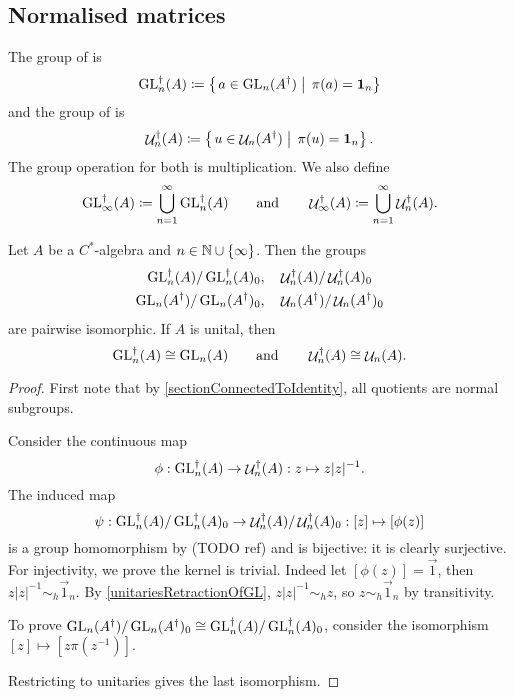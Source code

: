\subsection{Normalised matrices}
\begin{definition}
The group of  is
\[ \operatorname{GL}_n^\dagger(A) \coloneqq \left\{\left. a\in \operatorname{GL}_n(A^\dagger) \;\right|\; \pi(a) = \boldsymbol{\mathrm{1}}_n \right\} \]
and the group of  is
\[ \mathop{\mathcal{U}}\nolimits_n^\dagger(A) \coloneqq \left\{\left. u\in \mathop{\mathcal{U}}\nolimits_n(A^\dagger) \;\right|\; \pi(u) = \boldsymbol{\mathrm{1}}_n \right\}. \]
The group operation for both is multiplication. We also define
\[ \operatorname{GL}_\infty^\dagger(A) \coloneqq \bigcup_{n=1}^\infty\operatorname{GL}_n^\dagger(A) \qquad \text{and}\qquad \mathop{\mathcal{U}}\nolimits_\infty^\dagger(A) \coloneqq \bigcup_{n=1}^\infty\mathop{\mathcal{U}}\nolimits_n^\dagger(A). \]
\end{definition}

\begin{proposition} \label{normalisedQuotientsIsomorphisms}
Let $A$ be a $C^*$-algebra and $n\in \mathbb{N}\cup\{\infty\}$. Then the groups
\begin{align*}
\operatorname{GL}_n^\dagger(A) / \operatorname{GL}_n^\dagger(A)_0,& & &\mathop{\mathcal{U}}\nolimits_n^\dagger(A) / \mathop{\mathcal{U}}\nolimits_n^\dagger(A)_0 \\
\operatorname{GL}_n(A^\dagger) / \operatorname{GL}_n(A^\dagger)_0,& & &\mathop{\mathcal{U}}\nolimits_n(A^\dagger) / \mathop{\mathcal{U}}\nolimits_n(A^\dagger)_0
\end{align*}
are pairwise isomorphic. If $A$ is unital, then 
\[ \operatorname{GL}_n^\dagger(A) \cong \operatorname{GL}_n(A) \qquad \text{and} \qquad \mathop{\mathcal{U}}\nolimits_n^\dagger(A) \cong \mathop{\mathcal{U}}\nolimits_n(A). \]
\end{proposition}
\begin{proof}
First note that by \ref{sectionConnectedToIdentity}, all quotients are normal subgroups.

Consider the continuous map
\[ \phi: \operatorname{GL}_n^\dagger(A) \to \mathop{\mathcal{U}}\nolimits_n^\dagger(A): z\mapsto z|z|^{-1}. \]
The induced map
\[ \psi: \operatorname{GL}_n^\dagger(A) / \operatorname{GL}_n^\dagger(A)_0 \to \mathop{\mathcal{U}}\nolimits_n^\dagger(A) / \mathop{\mathcal{U}}\nolimits_n^\dagger(A)_0: [z] \mapsto [\phi(z)] \]
is a group homomorphism by (TODO ref) and is bijective: it is clearly surjective. For injectivity, we prove the kernel is trivial.
Indeed let $[\phi(z)] = \vec{1}$, then $z|z|^{-1} \sim_h \vec{1}_n$. By \ref{unitariesRetractionOfGL}, $z|z|^{-1}\sim_h z$, so $z\sim_h \vec{1}_n$ by transitivity.

To prove $\operatorname{GL}_n(A^\dagger) / \operatorname{GL}_n(A^\dagger)_0 \cong \operatorname{GL}_n^\dagger(A) / \operatorname{GL}_n^\dagger(A)_0$, consider the isomorphism $[z] \mapsto [z\pi(z^{-1})]$.

Restricting to unitaries gives the last isomorphism.
\end{proof}

